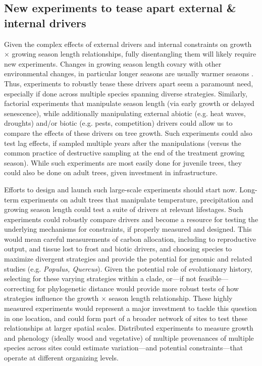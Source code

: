 \documentclass[11pt]{article}
\begin{document}
\subsection*{New experiments to tease apart external \& internal drivers}

Given the complex effects of external drivers and internal constraints on growth $\times$ growing season length relationships, fully disentangling them will likely require new experiments. Changes in growing season length covary with other environmental changes, in particular longer seasons are usually warmer seasons \citep{ipcc2021}. Thus, experiments to robustly tease these drivers apart seem a paramount need, especially if done across multiple species spanning diverse strategies. Similarly, factorial experiments that manipulate season length (via early growth or delayed senescence), while additionally manipulating external abiotic (e.g. heat waves, droughts) and/or biotic (e.g. pests, competition) drivers could allow us to compare the effects of these drivers on tree growth. Such experiments could also test lag effects, if sampled multiple years after the manipulations (versus the common practice of destructive sampling at the end of the treatment growing season). While such experiments are most easily done for juvenile trees, they could also be done on adult trees, given investment in infrastructure. %

Efforts to design and launch such large-scale experiments should start now. Long-term experiments on adult trees that manipulate temperature, precipitation and growing season length could test a suite of drivers at relevant lifestages. Such experiments could robustly compare drivers and become a resource for testing the underlying mechanisms for constraints, if properly measured and designed. This would mean careful measurements of carbon allocation, including to reproductive output, and tissue lost to frost and biotic drivers, and choosing species to maximize divergent strategies and provide the potential for genomic and related studies (e.g. \emph{Populus, Quercus}). Given the potential role of evolutionary history, selecting for these varying strategies within a clade, or---if not feasible---correcting for phylogenetic distance would provide more robust tests of how strategies influence the growth $\times$ season length relationship. %
These highly measured experiments  would represent a major investment to tackle this question in one location, and could form part of a broader network of sites to test these relationships at larger spatial scales. Distributed experiments to measure growth and phenology (ideally wood and vegetative) of multiple provenances of multiple species across sites could estimate variation---and potential constraints---that operate at different organizing levels. 
\end{document}
